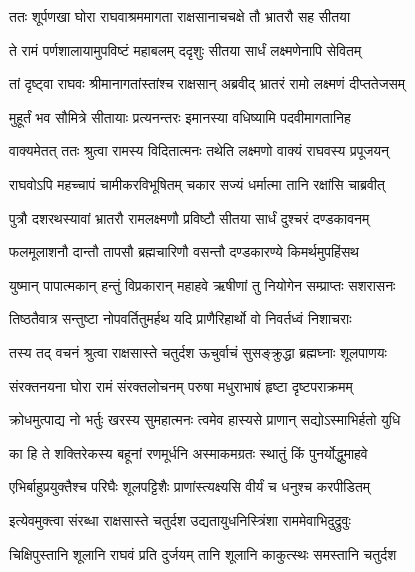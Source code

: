 
\twolineshloka
{ततः शूर्पणखा घोरा राघवाश्रममागता}
{राक्षसानाचचक्षे तौ भ्रातरौ सह सीतया} %

\twolineshloka
{ते रामं पर्णशालायामुपविष्टं महाबलम्}
{ददृशुः सीतया सार्धं लक्ष्मणेनापि सेवितम्} %

\twolineshloka
{तां दृष्ट्वा राघवः श्रीमानागतांस्तांश्च राक्षसान्}
{अब्रवीद् भ्रातरं रामो लक्ष्मणं दीप्ततेजसम्} %

\twolineshloka
{मुहूर्तं भव सौमित्रे सीतायाः प्रत्यनन्तरः}
{इमानस्या वधिष्यामि पदवीमागतानिह} %

\twolineshloka
{वाक्यमेतत् ततः श्रुत्वा रामस्य विदितात्मनः}
{तथेति लक्ष्मणो वाक्यं राघवस्य प्रपूजयन्} %

\twolineshloka
{राघवोऽपि महच्चापं चामीकरविभूषितम्}
{चकार सज्यं धर्मात्मा तानि रक्षांसि चाब्रवीत्} %

\twolineshloka
{पुत्रौ दशरथस्यावां भ्रातरौ रामलक्ष्मणौ}
{प्रविष्टौ सीतया सार्धं दुश्चरं दण्डकावनम्} %

\twolineshloka
{फलमूलाशनौ दान्तौ तापसौ ब्रह्मचारिणौ}
{वसन्तौ दण्डकारण्ये किमर्थमुपहिंसथ} %

\twolineshloka
{युष्मान् पापात्मकान् हन्तुं विप्रकारान् महाहवे}
{ऋषीणां तु नियोगेन सम्प्राप्तः सशरासनः} %

\twolineshloka
{तिष्ठतैवात्र सन्तुष्टा नोपवर्तितुमर्हथ}
{यदि प्राणैरिहार्थो वो निवर्तध्वं निशाचराः} %

\twolineshloka
{तस्य तद् वचनं श्रुत्वा राक्षसास्ते चतुर्दश}
{ऊचुर्वाचं सुसङ्क्रुद्धा ब्रह्मघ्नाः शूलपाणयः} %

\twolineshloka
{संरक्तनयना घोरा रामं संरक्तलोचनम्}
{परुषा मधुराभाषं हृष्टा दृष्टपराक्रमम्} %

\twolineshloka
{क्रोधमुत्पाद्य नो भर्तुः खरस्य सुमहात्मनः}
{त्वमेव हास्यसे प्राणान् सद्योऽस्माभिर्हतो युधि} %

\twolineshloka
{का हि ते शक्तिरेकस्य बहूनां रणमूर्धनि}
{अस्माकमग्रतः स्थातुं किं पुनर्योद्धुमाहवे} %

\twolineshloka
{एभिर्बाहुप्रयुक्तैश्च परिघैः शूलपट्टिशैः}
{प्राणांस्त्यक्ष्यसि वीर्यं च धनुश्च करपीडितम्} %

\twolineshloka
{इत्येवमुक्त्वा संरब्धा राक्षसास्ते चतुर्दश}
{उद्यतायुधनिस्त्रिंशा राममेवाभिदुद्रुवुः} %

\twolineshloka
{चिक्षिपुस्तानि शूलानि राघवं प्रति दुर्जयम्}
{तानि शूलानि काकुत्स्थः समस्तानि चतुर्दश} %

